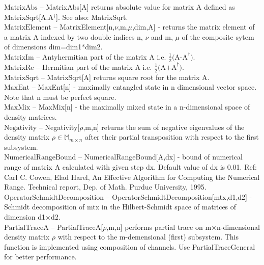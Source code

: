 \documentclass[a4paper,10pt]{scrartcl}
\begin{document}
\textbf{$ \text{MatrixAbs} $ }-- MatrixAbs[A] returns absolute value for matrix A defined as MatrixSqrt[A.A$  ^{\dagger } $]. See also: MatrixSqrt.$  $\\

\textbf{$ \text{MatrixElement} $ }-- MatrixElement[n,$\nu $,m,$\mu $,dim,A] - returns the matrix element of a matrix A indexed by two double indices n, $\nu $ and m, $\mu $ of the composite sytem of dimensions dim=dim1*dim2.$  $\\

\textbf{$ \text{MatrixIm} $ }-- Antyhermitian part of the matrix A i.e. $ \frac{1}{2}\text{(A-A} ^{\dagger }\text{).} $\\

\textbf{$ \text{MatrixRe} $ }-- Hermitian part of the matrix A i.e. $ \frac{1}{2}\text{(A+A} ^{\dagger }\text{).} $\\

\textbf{$ \text{MatrixSqrt} $ }-- MatrixSqrt[A] returns square root for the matrix A.$  $\\

\textbf{$ \text{MaxEnt} $ }-- MaxEnt[n] - maximally entangled state in n dimensional vector space. Note that n must be perfect square.$  $\\

\textbf{$ \text{MaxMix} $ }-- MaxMix[n] - the maximally mixed state in a n-dimensional space of density matrices.$  $\\

\textbf{$ \text{Negativity} $ }-- Negativity[$\rho $,m,n] returns the sum of negative eigenvalues of the density matrix $\rho \in $$ \mathbb{M}_{m\times n} $ after their partial transposition with respect to the first subsystem.$  $\\

\textbf{$ \text{NumericalRangeBound} $ }-- NumericalRangeBound[A,dx] - bound of numerical range of matrix A calculated with given step dx. Default value of dx is 0.01. Ref: Carl C. Cowen, Elad Harel, An Effective Algorithm for Computing the Numerical Range. Technical report, Dep. of Math. Purdue University, 1995.$  $\\

\textbf{$ \text{OperatorSchmidtDecomposition} $ }-- OperatorSchmidtDecomposition[mtx,d1,d2] - Schmidt decomposition of mtx in the Hilbert-Schmidt space of matrices of dimension d1$\times $d2.$  $\\

\textbf{$ \text{PartialTraceA} $ }-- PartialTraceA[$\rho $,m,n] performs partial trace on m$\times $n-dimensional density matrix $\rho $ with respect to the m-demensional (first) subsystem. This function is implemented using composition of channels. Use PartialTraceGeneral for better performance.$  $\\
\end{document}
